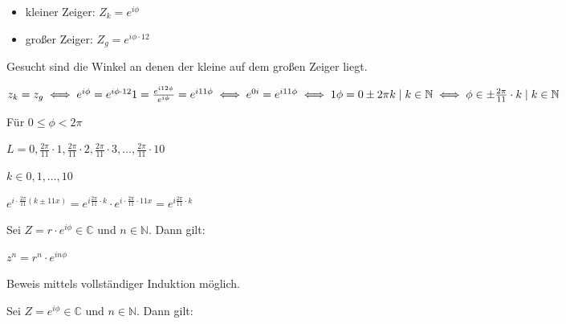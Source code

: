 \documentclass{../tudscript}
\begin{document}
\hypertarget{einfuxfchrung-in-die-mathematik-fuxfcr-informatikerinnen}{%
\label{einfuxfchrung-in-die-mathematik-fuxfcr-informatikerinnen}}

\hypertarget{vl}{%
\label{vl}}

\hypertarget{beispiel-der-komplexen-uhr}{%
\label{beispiel-der-komplexen-uhr}}

\begin{itemize}
\tightlist
\item
  kleiner Zeiger: \(Z_{k} = e^{i \phi}\)
\item
  großer Zeiger: \(Z_{g} = e^{i \phi \cdot 12}\)
\end{itemize}

Gesucht sind die Winkel an denen der kleine auf dem großen Zeiger liegt.

\(z_{k} = z_{g} \iff e^{i \phi} = e^{i \phi \cdot 12} \\ 1 = \frac{e^{i 12 \phi}}{e^{i \phi}}\\ = e^{i 11 \phi} \\ \iff e^{0 i} = e^{i 11 \phi} \\ \iff 1 \phi = {0 \pm 2 \pi k \mid k \in \mathbb{N}}\\ \iff \phi \in {\pm \frac{2 \pi}{11}\cdot k \mid k \in \mathbb{N}}\)

Für \(0 \leq \phi < 2 \pi\)

\(L = {0, \frac{2 \pi}{11}\cdot 1, \frac{2 \pi}{11}\cdot 2}, \frac{2 \pi}{11}\cdot 3, \dotsc, \frac{2 \pi}{11}\cdot 10\)

\(k \in {0, 1, \dotsc, 10}\)

\(e^{i \cdot \frac{2\pi}{11} (k \pm 11x)} = e^{i \frac{2 \pi}{11} \cdot k} \cdot e^{i \cdot \frac{2 \pi}{11} \cdot 11 x} = e^{i \frac{2 \pi}{11} \cdot k}\)

\hypertarget{satz-von-moirre}{%
\label{satz-von-moirre}}

Sei \(Z = r \cdot e^{i \phi} \in \mathbb{C}\) und \(n \in \mathbb{N}\).
Dann gilt:

\(z^n = r^n \cdot e^{i n \phi}\)

Beweis mittels vollständiger Induktion möglich.

\hypertarget{folgerung-formel-von-moirre}{%
\label{folgerung-formel-von-moirre}}

Sei \(Z = e^{i \phi} \in \mathbb{C}\) und \(n \in \mathbb{N}\). Dann
gilt:
\end{document}
